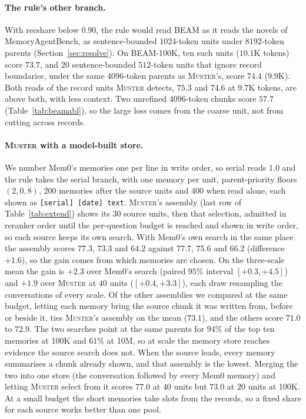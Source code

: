 \documentclass{article}
\newcommand{\sys}{\textsc{Muster}}
\newcommand{\serial}{\textsf{serial}}
\newcommand{\cov}{\textsf{recshare}}
\begin{document}
\paragraph{The rule's other branch.} With \cov{} below $0.90$, the rule would read BEAM as it reads the novels of
MemoryAgentBench, as sentence-bounded $1024$-token units under $8192$-token parents (Section~\ref{sec:resolve}). On BEAM-100K,
ten such units ($10.1$K tokens) score $73.7$, and $20$ sentence-bounded $512$-token units that ignore record boundaries,
under the same $4096$-token parents as \sys{}'s, score $74.4$ ($9.9$K). Both reads of the record units \sys{} detects,
$75.3$ and $74.6$ at $9.7$K tokens, are above both, with less context. Two unrefined $4096$-token chunks score $57.7$
(Table~\ref{tab:beamabl}), so the large loss comes from the coarse unit, not from cutting across records.

\paragraph{\sys{} with a model-built store.} We number Mem0's memories one per line in write order, so \serial{} reads
$1.0$ and the rule takes the serial branch, with one memory per unit, parent-priority floors $(2,0,8)$, $200$ memories after the source units and $400$ when read alone, each
shown as \texttt{[serial] [date] text}. \sys{}'s assembly (last row of Table~\ref{tab:extend}) shows its
$30$ source units, then that selection, admitted in reranker order until the per-question budget is reached and shown in write order, so each source keeps
its own search. With Mem0's own search in the same place the assembly scores $77.3$, $73.3$ and $64.2$ against $77.7$, $75.6$
and $66.2$ (difference $+1.6$), so the gain comes from which memories are chosen. On the three-scale mean the gain is $+2.3$ over Mem0's search (paired $95\%$ interval $[+0.3, +4.5]$) and $+1.9$ over \sys{} at $40$ units ($[+0.4, +3.3]$), each draw resampling the conversations of every scale. Of the other assemblies we compared at the same budget, letting each memory bring the source chunk it was written from, before or beside it, ties \sys{}'s assembly on the mean ($73.1$), and the others score $71.0$ to $72.9$. The two searches point at the same parents for $94\%$ of the top ten memories at 100K
and $61\%$ at 10M, so at scale the memory store reaches evidence the source search does not. When the source leads,
every memory summarises a chunk already shown, and that assembly is the lowest. Merging the two into one store (the conversation followed by every Mem0 memory) and letting \sys{} select from it
scores $77.0$ at $40$ units but $73.0$ at $20$ units at 100K. At a small budget the short memories take slots from the
records, so a fixed share for each source works better than one pool.
\end{document}
